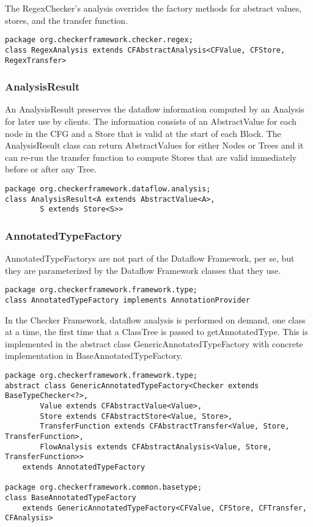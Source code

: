 The RegexChecker's analysis overrides the factory methods for abstract
values, stores, and the transfer function.

\begin{verbatim}
package org.checkerframework.checker.regex;
class RegexAnalysis extends CFAbstractAnalysis<CFValue, CFStore, RegexTransfer>
\end{verbatim}


\subsubsection{AnalysisResult}
\label{sec:analysis_result_class}

An AnalysisResult preserves the dataflow information computed by an
Analysis for later use by clients.  The information consists of an
AbstractValue for each node in the CFG and a Store that is valid at
the start of each Block.  The AnalysisResult class can return
AbstractValues for either Nodes or Trees and it can re-run the
transfer function to compute Stores that are valid immediately before
or after any Tree.

\begin{verbatim}
package org.checkerframework.dataflow.analysis;
class AnalysisResult<A extends AbstractValue<A>,
        S extends Store<S>>
\end{verbatim}


\subsubsection{AnnotatedTypeFactory}
\label{sec:annotated_type_factory_classes}

AnnotatedTypeFactorys are not part of the Dataflow Framework, per se,
but they are parameterized by the Dataflow Framework classes that they
use.

\begin{verbatim}
package org.checkerframework.framework.type;
class AnnotatedTypeFactory implements AnnotationProvider
\end{verbatim}

In the Checker Framework, dataflow analysis is performed on demand,
one class at a time, the first time that a ClassTree is passed to
getAnnotatedType.  This is implemented in the abstract class
GenericAnnotatedTypeFactory with concrete implementation in
BaseAnnotatedTypeFactory.

\begin{verbatim}
package org.checkerframework.framework.type;
abstract class GenericAnnotatedTypeFactory<Checker extends BaseTypeChecker<?>,
        Value extends CFAbstractValue<Value>,
        Store extends CFAbstractStore<Value, Store>,
        TransferFunction extends CFAbstractTransfer<Value, Store, TransferFunction>,
        FlowAnalysis extends CFAbstractAnalysis<Value, Store, TransferFunction>>
    extends AnnotatedTypeFactory

package org.checkerframework.common.basetype;
class BaseAnnotatedTypeFactory
    extends GenericAnnotatedTypeFactory<CFValue, CFStore, CFTransfer, CFAnalysis>
\end{verbatim}


